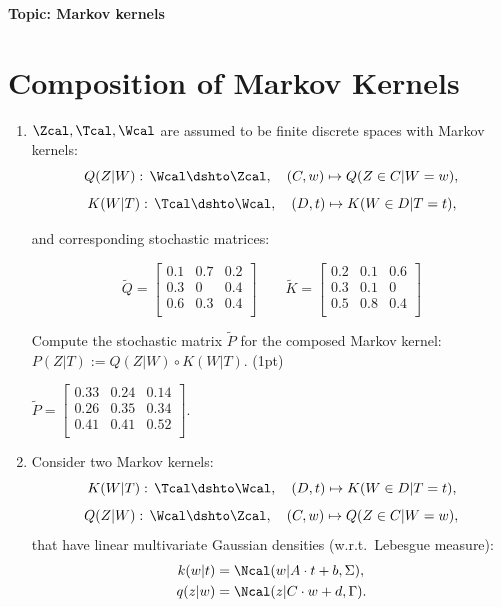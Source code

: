 

\flushleft\textbf{Topic: Markov kernels}

\section{Composition of Markov Kernels}
\begin{enumerate}
\item $\Zcal, \Tcal, \Wcal$ are assumed to be finite discrete spaces with Markov kernels:\\
 
  \[Q(Z|W):\, \Wcal \dshto \Zcal,\quad (C,w) \mapsto Q(Z \in C|W=w),  \]
  \[K(W|T):\, \Tcal \dshto \Wcal,\quad (D,t) \mapsto K(W \in D|T=t),  \]

and corresponding stochastic matrices:

\[\tilde Q = 
\begin{bmatrix}
0.1 & 0.7 & 0.2 \\
0.3 & 0   & 0.4 \\
0.6 & 0.3 & 0.4 \\
\end{bmatrix} 
\qquad
\tilde K = 
\begin{bmatrix}
0.2 & 0.1 & 0.6 \\
0.3 & 0.1 & 0 \\
0.5 & 0.8 & 0.4 \\
\end{bmatrix}\]

    
Compute the stochastic matrix $\tilde P$ for the composed  Markov kernel: $P(Z|T):=Q(Z|W) \circ K(W|T)$.
(1pt)
\begin{gradedsolution}
$\tilde P = \begin{bmatrix}
0.33 & 0.24 & 0.14 \\
0.26 & 0.35 & 0.34 \\
0.41 & 0.41 & 0.52 \\
\end{bmatrix}$.
\end{gradedsolution}

\item Consider two Markov kernels:
  \[K(W|T):\, \Tcal \dshto \Wcal,\quad (D,t) \mapsto K(W \in D|T=t),  \]
  \[Q(Z|W):\, \Wcal \dshto \Zcal,\quad (C,w) \mapsto Q(Z \in C|W=w),  \]
  that have linear multivariate Gaussian densities (w.r.t.\ Lebesgue measure):
\begin{align*} 
k(w|t) &= \Ncal(w|A \cdot t +b, \Sigma),  \\
q(z|w) & = \Ncal(z| C \cdot w + d, \Gamma).
\end{align*}


\end{enumerate}
